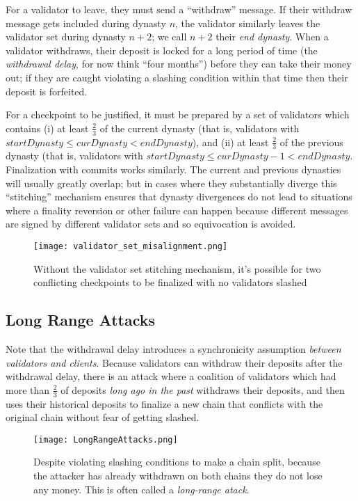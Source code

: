 \documentclass[12pt, final]{article}
\begin{document}
For a validator to leave, they must send a ``withdraw'' message. If their withdraw message gets included during dynasty $n$, the validator similarly leaves the validator set during dynasty $n+2$; we call $n+2$ their \textit{end dynasty}. When a validator withdraws, their deposit is locked for a long period of time (the \textit{withdrawal delay}, for now think ``four months'') before they can take their money out; if they are caught violating a slashing condition within that time then their deposit is forfeited.

For a checkpoint to be justified, it must be prepared by a set of validators which contains (i) at least $\frac{2}{3}$ of the current dynasty (that is, validators with $startDynasty \le curDynasty < endDynasty$), and (ii) at least $\frac{2}{3}$ of the previous dynasty (that is, validators with $startDynasty \le curDynasty - 1 < endDynasty$. Finalization with commits works similarly. The current and previous dynasties will usually greatly overlap; but in cases where they substantially diverge this ``stitching'' mechanism ensures that dynasty divergences do not lead to situations where a finality reversion or other failure can happen because different messages are signed by different validator sets and so equivocation is avoided.

\begin{figure}[h!tb]
\centering
\texttt{[image: validator\_set\_misalignment.png]}
\caption{Without the validator set stitching mechanism, it's possible for two conflicting checkpoints to be finalized with no validators slashed}
\label{fig:dynamic2}
\end{figure}

\subsection{Long Range Attacks}

Note that the withdrawal delay introduces a synchronicity assumption \textit{between validators and clients}. Because validators can withdraw their deposits after the withdrawal delay, there is an attack where a coalition of validators which had more than $\frac{2}{3}$ of deposits \textit{long ago in the past} withdraws their deposits, and then uses their historical deposits to finalize a new chain that conflicts with the original chain without fear of getting slashed.

\begin{figure}
\centering
\texttt{[image: LongRangeAttacks.png]}
\caption{Despite violating slashing conditions to make a chain split, because the attacker has already withdrawn on both chains they do not lose any money. This is often called a \textit{long-range atack}.}
\label{fig:dynamic3}
\end{figure}
\end{document}
